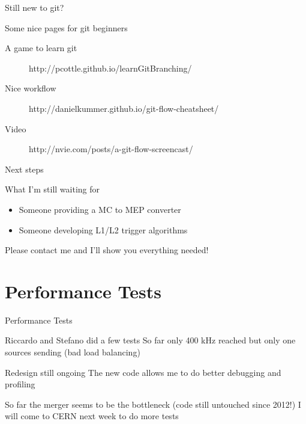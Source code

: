 \begin{frame}{Still new to git?}{}
	\begin{block}{Some nice pages for git beginners}
		\begin{description}
  			\item[A game to learn git] http://pcottle.github.io/learnGitBranching/
  			\item[Nice workflow]	http://danielkummer.github.io/git-flow-cheatsheet/
  			\item[Video] http://nvie.com/posts/a-git-flow-screencast/
		\end{description}
	\end{block}
\end{frame}

\begin{frame}{Next steps}{}
	\begin{block}{What I'm still waiting for}
		\begin{itemize}
  			\item Someone providing a MC to MEP converter
  			\item Someone developing L1/L2 trigger algorithms		
		\end{itemize}
	\end{block}
	
	Please contact me and I'll show you everything needed!
\end{frame}

\section*{Performance Tests}

\begin{frame}{Performance Tests}{}
	
	\begin{block}{Riccardo and Stefano did a few tests}
		So far only 400 kHz reached but only one sources sending (bad load balancing)
	\end{block}
	
	\begin{block}{Redesign still ongoing}
		The new code allows me to do better debugging and profiling
	\end{block}
	
	So far the merger seems to be the bottleneck (code still untouched since 2012!)
	\newline
	I will come to CERN next week to do more tests
\end{frame}